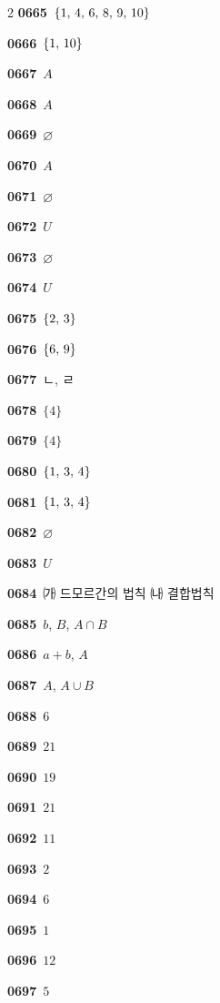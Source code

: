 \documentclass[10pt,a4paper]{article}
\begin{document}
\begin{multicols}{2}
\noindent\textbf{0665}\ $\{1,\mkern3mu 4,\mkern3mu 6,\mkern3mu 8,\mkern3mu 9,\mkern3mu 10\}$\par
\noindent\textbf{0666}\ $\{1,\mkern3mu 10\}$\par
\noindent\textbf{0667}\ $A$\par
\noindent\textbf{0668}\ $A$\par
\noindent\textbf{0669}\ $\varnothing$\par
\noindent\textbf{0670}\ $A$\par
\noindent\textbf{0671}\ $\varnothing$\par
\noindent\textbf{0672}\ $U$\par
\noindent\textbf{0673}\ $\varnothing$\par
\noindent\textbf{0674}\ $U$\par
\noindent\textbf{0675}\ $\{2,\mkern3mu 3\}$\par
\noindent\textbf{0676}\ $\{6,\mkern3mu 9\}$\par
\noindent\textbf{0677}\ ㄴ, ㄹ\par
\noindent\textbf{0678}\ $\{4\}$\par
\noindent\textbf{0679}\ $\{4\}$\par
\noindent\textbf{0680}\ $\{1,\mkern3mu 3,\mkern3mu 4\}$\par
\noindent\textbf{0681}\ $\{1,\mkern3mu 3,\mkern3mu 4\}$\par
\noindent\textbf{0682}\ $\varnothing$\par
\noindent\textbf{0683}\ $U$\par
\noindent\textbf{0684}\ ㈎ 드모르간의 법칙 ㈏ 결합법칙\par
\noindent\textbf{0685}\ $b$, $B$, $A\cap B$\par
\noindent\textbf{0686}\ $a+b$, $A$\par
\noindent\textbf{0687}\ $A$, $A\cup B$\par
\noindent\textbf{0688}\ $6$\par
\noindent\textbf{0689}\ $21$\par
\noindent\textbf{0690}\ $19$\par
\noindent\textbf{0691}\ $21$\par
\noindent\textbf{0692}\ $11$\par
\noindent\textbf{0693}\ $2$\par
\noindent\textbf{0694}\ $6$\par
\noindent\textbf{0695}\ $1$\par
\noindent\textbf{0696}\ $12$\par
\noindent\textbf{0697}\ $5$\par

\end{multicols}
\end{document}
